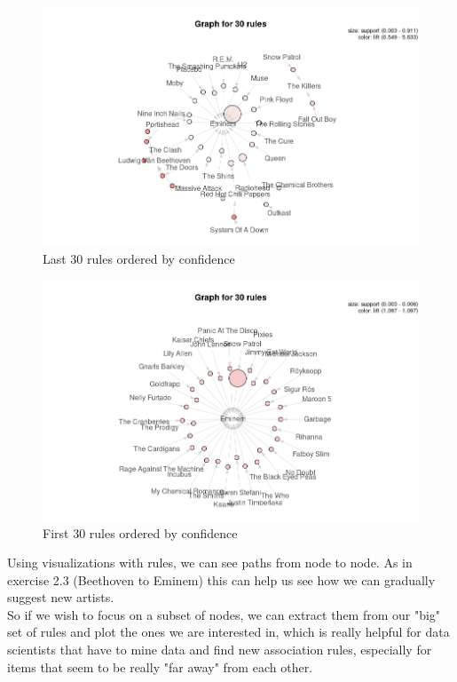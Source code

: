 \documentclass[a4paper]{article}
\begin{document}
	\begin{center}
		\begin{figure}[!ht]
			\includegraphics[width=\textwidth]{images/plot2.png}
			\caption{Last 30 rules ordered by confidence}
		\end{figure}
	\end{center}
	
	
	
	\begin{center}
		\begin{figure}[!ht]
			\includegraphics[width=\textwidth]{images/plot3.png}
			\caption{First 30 rules ordered by confidence}
		\end{figure}
	\end{center}
	
	\break Using visualizations with rules, we can see paths from node to node. As in exercise 2.3 (Beethoven to Eminem) this can help us see how we can gradually suggest new artists.\\
	So if we wish to focus on a subset of nodes, we can extract them from our "big" set of rules and plot the ones we are interested in, which is really helpful for data scientists that have to mine data and find new association rules, especially for items that seem to be really "far away" from each other.
	
	
\end{document}
